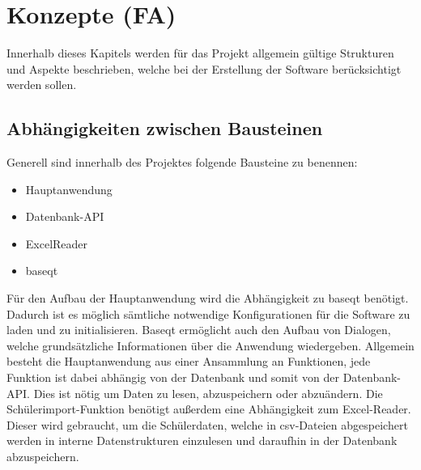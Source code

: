 \section{Konzepte (FA)}
Innerhalb dieses Kapitels werden für das Projekt allgemein gültige Strukturen und Aspekte beschrieben, welche bei der Erstellung der Software berücksichtigt werden sollen.

\subsection{Abhängigkeiten zwischen Bausteinen}
Generell sind innerhalb des Projektes folgende Bausteine zu benennen:
\begin{itemize}
	\item Hauptanwendung
	\item Datenbank-API
	\item ExcelReader
	\item baseqt
\end{itemize}
Für den Aufbau der Hauptanwendung wird die Abhängigkeit zu baseqt benötigt. Dadurch ist es möglich sämtliche notwendige Konfigurationen für die Software zu laden und zu initialisieren. Baseqt ermöglicht auch den Aufbau von Dialogen, welche grundsätzliche Informationen über die Anwendung wiedergeben. Allgemein besteht die Hauptanwendung aus einer Ansammlung an Funktionen, jede Funktion ist dabei abhängig von der Datenbank und somit von der Datenbank-API. Dies ist nötig um Daten zu lesen, abzuspeichern oder abzuändern. Die Schülerimport-Funktion benötigt außerdem eine Abhängigkeit zum Excel-Reader. Dieser wird gebraucht, um die Schülerdaten, welche in csv-Dateien abgespeichert werden in interne Datenstrukturen einzulesen und daraufhin in der Datenbank abzuspeichern.

